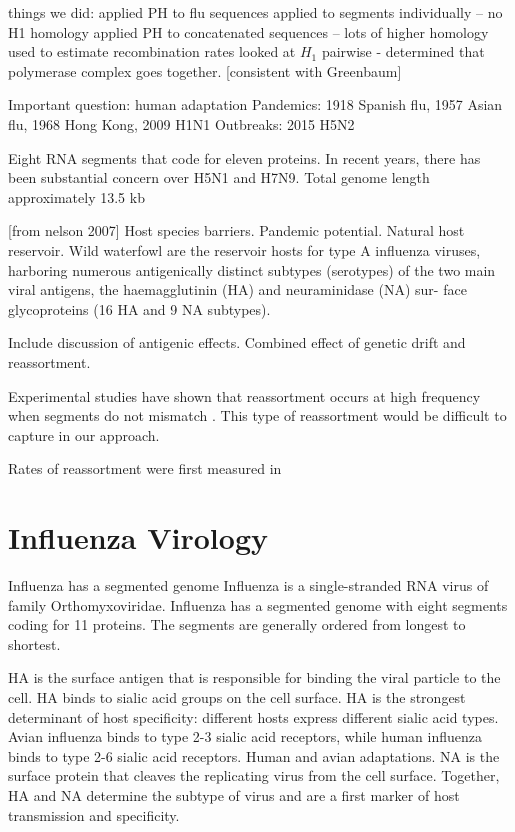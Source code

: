 things we did:
applied PH to flu sequences
applied to segments individually -- no H1 homology
applied PH to concatenated sequences -- lots of higher homology
used to estimate recombination rates
looked at $H_1$ pairwise - determined that polymerase complex goes together.
[consistent with Greenbaum]

Important question: human adaptation
Pandemics: 1918 Spanish flu, 1957 Asian flu, 1968 Hong Kong, 2009 H1N1
Outbreaks: 2015 H5N2

Eight RNA segments that code for eleven proteins.
In recent years, there has been substantial concern over H5N1 and H7N9.
Total genome length approximately 13.5 kb

[from nelson 2007]
Host species barriers.
Pandemic potential.
Natural host reservoir.
 Wild waterfowl are the reservoir hosts for type A influenza viruses, harboring numerous antigenically distinct subtypes (serotypes) of the two main viral antigens, the haemagglutinin (HA) and neuraminidase (NA) sur- face glycoproteins (16 HA and 9 NA subtypes).

Include discussion of antigenic effects.
Combined effect of genetic drift and reassortment.

Experimental studies have shown that reassortment occurs at high frequency when segments do not mismatch \cite{Marshall:2013kn}.
This type of reassortment would be difficult to capture in our approach.

Rates of reassortment were first measured in \cite{Macken:2006jw}

\section{Influenza Virology}
\label{flu:virology}

Influenza has a segmented genome
Influenza is a single-stranded RNA virus of family Orthomyxoviridae.
Influenza has a segmented genome with eight segments coding for 11 proteins.
The segments are generally ordered from longest to shortest.

HA is the surface antigen that is responsible for binding the viral particle to the cell.
HA binds to sialic acid groups on the cell surface.
HA is the strongest determinant of host specificity: different hosts express different sialic acid types.
Avian influenza binds to type 2-3 sialic acid receptors, while human influenza binds to type 2-6 sialic acid receptors.
Human and avian adaptations.
NA is the surface protein that cleaves the replicating virus from the cell surface.
Together, HA and NA determine the subtype of virus and are a first marker of host transmission and specificity.

